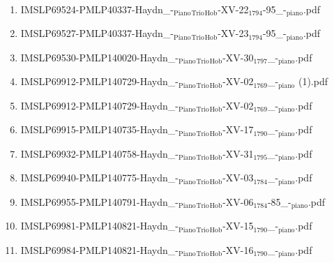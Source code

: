\documentclass[11pt]{article}
\begin{document}
\begin{enumerate}
\begin{enumerate}
\item IMSLP69524-PMLP40337-Haydn\_-$_{\text{Piano}}$$_{\text{Trio}}$$_{\text{Hob}}$-XV-22$_{\text{1794}}$-95\_-$_{\text{piano}}$.pdf
\label{sec-1-1-1-1-44-38-5-11}

\item IMSLP69527-PMLP40337-Haydn\_-$_{\text{Piano}}$$_{\text{Trio}}$$_{\text{Hob}}$-XV-23$_{\text{1794}}$-95\_-$_{\text{piano}}$.pdf
\label{sec-1-1-1-1-44-38-5-12}

\item IMSLP69530-PMLP140020-Haydn\_-$_{\text{Piano}}$$_{\text{Trio}}$$_{\text{Hob}}$-XV-30$_{\text{1797}}$\_-$_{\text{piano}}$.pdf
\label{sec-1-1-1-1-44-38-5-13}

\item IMSLP69912-PMLP140729-Haydn\_-$_{\text{Piano}}$$_{\text{Trio}}$$_{\text{Hob}}$-XV-02$_{\text{1769}}$\_-$_{\text{piano}}$ (1).pdf
\label{sec-1-1-1-1-44-38-5-14}

\item IMSLP69912-PMLP140729-Haydn\_-$_{\text{Piano}}$$_{\text{Trio}}$$_{\text{Hob}}$-XV-02$_{\text{1769}}$\_-$_{\text{piano}}$.pdf
\label{sec-1-1-1-1-44-38-5-15}

\item IMSLP69915-PMLP140735-Haydn\_-$_{\text{Piano}}$$_{\text{Trio}}$$_{\text{Hob}}$-XV-17$_{\text{1790}}$\_-$_{\text{piano}}$.pdf
\label{sec-1-1-1-1-44-38-5-16}

\item IMSLP69932-PMLP140758-Haydn\_-$_{\text{Piano}}$$_{\text{Trio}}$$_{\text{Hob}}$-XV-31$_{\text{1795}}$\_-$_{\text{piano}}$.pdf
\label{sec-1-1-1-1-44-38-5-17}

\item IMSLP69940-PMLP140775-Haydn\_-$_{\text{Piano}}$$_{\text{Trio}}$$_{\text{Hob}}$-XV-03$_{\text{1784}}$\_-$_{\text{piano}}$.pdf
\label{sec-1-1-1-1-44-38-5-18}

\item IMSLP69955-PMLP140791-Haydn\_-$_{\text{Piano}}$$_{\text{Trio}}$$_{\text{Hob}}$-XV-06$_{\text{1784}}$-85\_-$_{\text{piano}}$.pdf
\label{sec-1-1-1-1-44-38-5-19}

\item IMSLP69981-PMLP140821-Haydn\_-$_{\text{Piano}}$$_{\text{Trio}}$$_{\text{Hob}}$-XV-15$_{\text{1790}}$\_-$_{\text{piano}}$.pdf
\label{sec-1-1-1-1-44-38-5-20}

\item IMSLP69984-PMLP140821-Haydn\_-$_{\text{Piano}}$$_{\text{Trio}}$$_{\text{Hob}}$-XV-16$_{\text{1790}}$\_-$_{\text{piano}}$.pdf
\label{sec-1-1-1-1-44-38-5-21}


\end{enumerate}
\end{enumerate}
\end{document}
